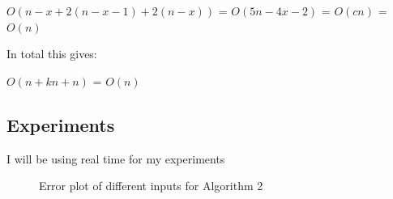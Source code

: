 \documentclass{article}
\begin{document}
$O(n-x + 2(n-x-1) + 2(n-x))$ = $O(5n-4x-2)$ = $O(cn)$ = $O(n)$

In total this gives:

$O(n + kn + n)$ = $O(n)$

\subsection{Experiments}
\label{sec:experiments2}

I will be using real time for my experiments

 \begin{figure}
   \centering
  
   \caption{Error plot of different inputs for Algorithm 2}
   \label{fig:experiment3}
\end{figure}
\end{document}
